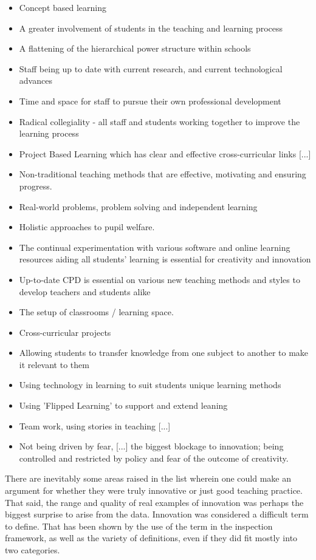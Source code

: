 \begin{itemize}
\item Concept based learning
\item A greater involvement of students in the teaching and learning process
\item A flattening of the hierarchical power structure within schools
\item Staff being up to date with current research, and current technological advances
\item Time and space for staff to pursue their own professional development
\item Radical collegiality - all staff and students working together to improve the learning process
\item Project Based Learning which has clear and effective cross-curricular links [...]
\item Non-traditional teaching methods that are effective, motivating and ensuring progress.
\item Real-world problems, problem solving and independent learning
\item Holistic approaches to pupil welfare.
\item The continual experimentation with various software and online learning resources aiding all students' learning is essential for creativity and innovation
\item Up-to-date CPD is essential on various new teaching methods and styles to develop teachers and students alike
\item The setup of classrooms / learning space.
\item Cross-curricular projects
\item Allowing students to transfer knowledge from one subject to another to make it relevant to them
\item Using technology in learning to suit students unique learning methods
\item Using 'Flipped Learning' to support and extend leaning
\item Team work, using stories in teaching [...]
\item Not being driven by fear, [...] the biggest blockage to innovation; being controlled and restricted by policy and fear of the outcome of creativity.
\end{itemize}

There are inevitably some areas raised in the list wherein one could make an argument for whether they were truly innovative or just good teaching practice. That said, the range and quality of real examples of innovation was perhaps the biggest surprise to arise from the data. Innovation was considered a difficult term to define. That has been shown by the use of the term in the inspection framework, as well as the variety of definitions, even if they did fit mostly into two categories. 

